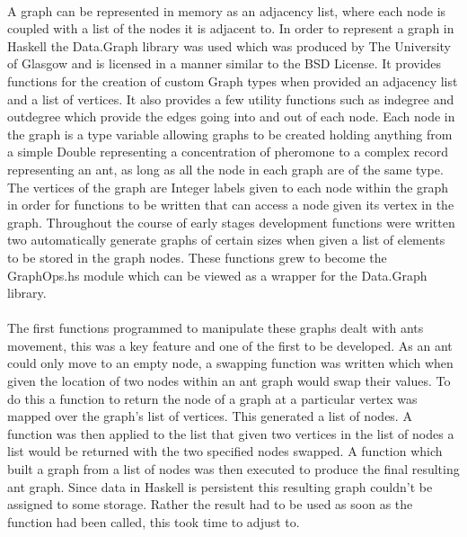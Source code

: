 \documentclass[main.tex]{subfiles}
\begin{document}
\paragraph{}A graph can be represented in memory as an adjacency list, where each node is coupled with a list of the nodes it is adjacent to. In order to represent a graph in Haskell the Data.Graph library was used which was produced  by The University of Glasgow and is licensed in a manner similar to the BSD License. It provides functions for the creation of custom Graph types when provided an adjacency list and a list of vertices. It also provides a few utility functions such as indegree and outdegree  which provide the edges going into and out of each node. Each node in the graph is a type variable allowing graphs to be created holding anything from a simple Double representing a concentration of pheromone to a complex record representing an ant, as long as all the node in each graph are of the same type. The vertices of the graph are Integer labels given to each node within the graph in order for functions to be written that can access a node given its vertex in the graph. Throughout the course of early stages development functions were written two automatically generate graphs of certain sizes when given a list of elements to be stored in the graph nodes. These functions grew to become the GraphOps.hs module which can be viewed as a wrapper for the Data.Graph library.

\paragraph{} The first functions programmed to manipulate these graphs dealt with ants movement, this was a key feature and one of the first to be developed. As an ant could only move to an empty node, a swapping function was written which when given the location of two nodes within an ant graph would swap their values. To do this a function to return the node of a graph at a particular vertex was mapped over the graph's list of vertices. This generated a list of nodes. A function was then applied to the list that given two vertices in the list of nodes a list would be returned with the two specified nodes swapped. A function which built a graph from a list of nodes was then executed to produce the final resulting ant graph. Since data in Haskell is persistent this resulting graph couldn't be assigned to some storage. Rather the result had to be used as soon as the function had been called, this took time to adjust to.
\end{document}
